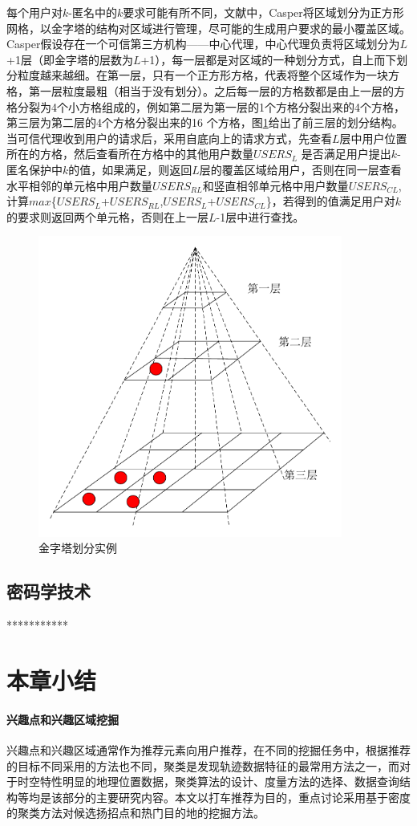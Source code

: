 每个用户对$k$-匿名中的$k$要求可能有所不同，文献\cite{Mokbel}中，Casper将区域划分为正方形网格，以金字塔的结构对区域进行管理，尽可能的生成用户要求的最小覆盖区域。Casper假设存在一个可信第三方机构——中心代理，中心代理负责将区域划分为$L$+1层（即金字塔的层数为$L$+1），每一层都是对区域的一种划分方式，自上而下划分粒度越来越细。在第一层，只有一个正方形方格，代表将整个区域作为一块方格，第一层粒度最粗（相当于没有划分）。之后每一层的方格数都是由上一层的方格分裂为4个小方格组成的，例如第二层为第一层的1个方格分裂出来的4个方格，第三层为第二层的4个方格分裂出来的16 个方格，图\ref{fig:GoldTower_pdf}给出了前三层的划分结构。当可信代理收到用户的请求后，采用自底向上的请求方式，先查看$L$层中用户位置所在的方格，然后查看所在方格中的其他用户数量$USERS_L$ 是否满足用户提出$k$- 匿名保护中$k$的值，如果满足，则返回$L$层的覆盖区域给用户，否则在同一层查看水平相邻的单元格中用户数量$USERS_{RL}$和竖直相邻单元格中用户数量$USERS_{CL}$,计算$max$\{$USERS_L$+$USERS_{RL}$,$USERS_L$+$USERS_{CL}$\}，若得到的值满足用户对$k$的要求则返回两个单元格，否则在上一层$L$-1层中进行查找。
\begin{figure}[H]
\centering
\includegraphics[width=10cm]{fig/GoldTower.pdf}
\caption{金字塔划分实例} %
\label{fig:GoldTower_pdf}
\end{figure}
\subsection{密码学技术}
***********

\section{本章小结}
\paragraph{兴趣点和兴趣区域挖掘}

兴趣点和兴趣区域通常作为推荐元素向用户推荐，在不同的挖掘任务中，根据推荐的目标不同采用的方法也不同，聚类是发现轨迹数据特征的最常用方法之一，而对于时空特性明显的地理位置数据，聚类算法的设计、度量方法的选择、数据查询结构等均是该部分的主要研究内容。本文以打车推荐为目的，重点讨论采用基于密度的聚类方法对候选扬招点和热门目的地的挖掘方法。


